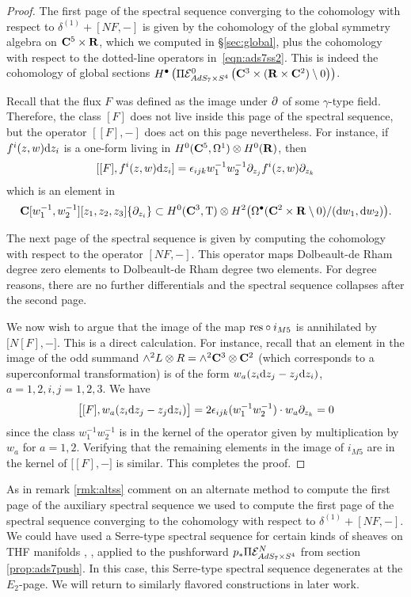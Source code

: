 \documentclass[../main.tex]{subfiles}
\begin{document}
\begin{proof}
The first page of the spectral sequence converging to the cohomology with respect to $\delta^{(1)} + [N F, -]$ is given by the cohomology of the global symmetry algebra on $\mathbf{C}^5 \times \mathbf{R}$, which we computed in \S \ref{sec:global}, plus the cohomology with respect to the dotted-line operators in~\eqref{eqn:ads7ss2}. This is indeed the cohomology of global sections $H^\bullet \left ( \Pi \mathcal{E}^0 _{AdS_7\times S^4} \left ( \mathbf{C}^3\times (\mathbf{R}\times \mathbf{C}^2)\setminus 0\right )\right )$.

Recall that the flux $F$ was defined as the image under $\partial$ of some $\gamma$-type field. Therefore, the class $[F]$ does not live inside this page of the spectral sequence, but the operator $[[F], -]$ does act on this page nevertheless. For instance, if $f^i(z,w) \mathrm{d} z_i$ is a one-form living in $H^0(\mathbf{C}^5, \Omega^1) \otimes H^0(\mathbf{R})$, then
\[
[ [F] , f^i (z,w) \mathrm{d} z_i ] = \epsilon_{ijk} w_1^{-1} w_2^{-1} \partial_{z_j} f^i(z,w) \partial_{z_k} 
\]
which is an element in 
\[
\mathbf{C}[w_1^{-1}, w_2^{-1}][z_1,z_2,z_3] \{\partial_{z_i}\} \subset H^0(\mathbf{C}^3, {\mathrm{T}}) \otimes H^2 \big(\Omega^\bullet(\mathbf{C}^2 \times \mathbf{R} \setminus 0) / (\mathrm{d} w_1 , \mathrm{d} w_2) \big) .
\]

The next page of the spectral sequence is given by computing the cohomology with respect to the operator $[N F,-]$. This operator maps Dolbeault-de Rham degree zero elements to Dolbeault-de Rham degree two elements. For degree reasons, there are no further differentials and the spectral sequence collapses after the second page. 

We now wish to argue that the image of the map $\mathrm{res}\circ i_{M5}$ is annihilated by $\big[ N [F] , - \big]$. This is a direct calculation. For instance, recall that an element in the image of the odd summand $\wedge^2 L \otimes R = \wedge^2 \mathbf{C}^3 \otimes \mathbf{C}^2$ (which corresponds to a superconformal transformation) is of the form $w_a (z_i \mathrm{d} z_j - z_j \mathrm{d} z_i)$, $a=1,2, i,j=1,2,3$. 
We have
\[
\big[[F] , w_a (z_i \mathrm{d} z_j - z_j \mathrm{d} z_i)\big] = 2 \epsilon_{ijk} (w_1^{-1} w_2^{-1}) \cdot w_a \partial_{z_k} = 0
\]
since the class $w_1^{-1} w_2^{-1}$ is in the kernel of the operator given by multiplication by $w_a$ for $a=1,2$.
Verifying that the remaining elements in the image of $i_{M5}$ are in the kernel of $\big[ [F], -\big]$ is similar.
This completes the proof.
\end{proof}

\begin{rmk}
As in remark \ref{rmk:altss} comment on an alternate method to compute the first page of the auxiliary spectral sequence we used to compute the first page of the spectral sequence converging to the cohomology with respect to $\delta^{(1)} + [NF, - ]$. We could have used a Serre-type spectral sequence for certain kinds of sheaves on THF manifolds \cite{KamberTondeur}, \cite{KormanThesis}, applied to the pushforward $ p_* \Pi \mathcal{E}^N_{AdS_7\times S^4}$ from section \ref{prop:ads7push}. In this case, this Serre-type spectral sequence degenerates at the $E_2$-page. We will return to similarly flavored constructions in later work.
\end{rmk}
\end{document}
